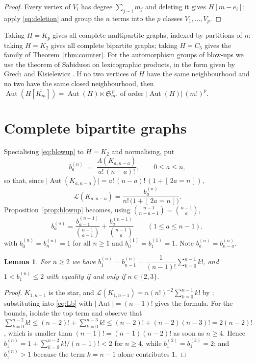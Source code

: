 \documentclass[11pt]{article}
\newtheorem{lemma}[theorem]{Lemma}
\theoremstyle{definition}
\DeclareMathOperator{\Aut}{Aut}
\newcommand{\Lk}{\mathcal{L}}
\newcommand{\bin}[2]{\binom{#1}{#2}}
\begin{document}
\begin{proof}
Every vertex of $V_i$ has degree $\sum_{j\sim i}m_j$ and deleting it gives $H[m-e_i]$; apply \eqref{eq:deletion} and group the $n$ terms into the $p$ classes $V_1,\dots,V_p$.
\end{proof}

Taking $H=K_p$ gives all complete multipartite graphs, indexed by partitions of $n$; taking $H=K_2$ gives all complete bipartite graphs; taking $H=C_5$ gives the family of Theorem~\ref{thm:counter}. For the automorphism groups of blow-ups we use the theorem of Sabidussi \cite{Sab59,Sab61} on lexicographic products, in the form given by Grech and Kisielewicz \cite[\S1]{GK22}. If no two vertices of $H$ have the same neighbourhood and no two have the same closed neighbourhood, then $\Aut(H[\overline{K_m}])=\Aut(H)\ltimes \mathfrak{S}_m^{\,p}$, of order $\lvert\Aut(H)\rvert\,(m!)^p$.

\section{Complete bipartite graphs}\label{sec:bip}

Specialising \eqref{eq:blowup} to $H=K_2$ and normalising, put
\[
b^{(n)}_a\;=\;\frac{A(K_{a,n-a})}{a!\,(n-a)!},\qquad 0\le a\le n,
\]
so that, since $\lvert\Aut(K_{a,n-a})\rvert=a!\,(n-a)!\,(1+[\,2a=n\,])$,
\begin{equation}\label{eq:Lb}
\Lk(K_{a,n-a})=\frac{b^{(n)}_a}{n!\,\big(1+[\,2a=n\,]\big)} .
\end{equation}
Proposition~\ref{prop:blowup} becomes, using $\bin{n-1}{n-a-1}=\bin{n-1}{a}$,
\begin{equation}\label{eq:brec}
b^{(n)}_a=\frac{b^{(n-1)}_{a-1}}{\bin{n-1}{a-1}}+\frac{b^{(n-1)}_{a}}{\bin{n-1}{a}}
\qquad (1\le a\le n-1),
\end{equation}
with $b^{(n)}_0=b^{(n)}_n=1$ for all $n\ge1$ and $b^{(1)}_0=b^{(1)}_1=1$. Note $b^{(n)}_a=b^{(n)}_{n-a}$.

\begin{lemma}\label{lem:b1}
For $n\ge 2$ we have $b^{(n)}_1=b^{(n)}_{n-1}=\dfrac{1}{(n-1)!}\displaystyle\sum_{k=0}^{n-1}k!$, and $1<b^{(n)}_1\le 2$ with equality if and only if $n\in\{2,3\}$.
\end{lemma}

\begin{proof}
$K_{1,n-1}$ is the star, and $\Lk(K_{1,n-1})=n(n!)^{-2}\sum_{k=0}^{n-1}k!$ by \cite[Prop.~20]{BMS14}; substituting into \eqref{eq:Lb} with $\lvert\Aut\rvert=(n-1)!$ gives the formula. For the bounds, isolate the top term and observe that
$\sum_{k=0}^{n-2}k!\le (n-2)!+\sum_{k=0}^{n-3}k!\le (n-2)!+(n-2)(n-3)!=2(n-2)!$,
which is smaller than $(n-1)!=(n-1)(n-2)!$ as soon as $n\ge4$. Hence $b^{(n)}_1=1+\sum_{k=0}^{n-2}k!/(n-1)!<2$ for $n\ge4$, while $b^{(2)}_1=b^{(3)}_1=2$; and $b^{(n)}_1>1$ because the term $k=n-1$ alone contributes $1$.
\end{proof}
\end{document}
